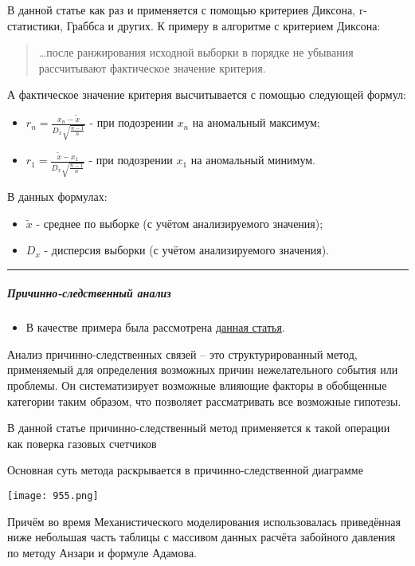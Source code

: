 \documentclass[
]{article}
\providecommand{\tightlist}{%
  \setlength{\itemsep}{0pt}\setlength{\parskip}{0pt}}
\begin{document}
В данной статье как раз и применяется с помощью критериев Диксона,
r-статистики, Граббса и других. К примеру в алгоритме с критерием
Диксона:

\begin{quote}
\ldots после ранжирования исходной выборки в порядке не убывания
рассчитывают фактическое значение критерия.
\end{quote}

А фактическое значение критерия высчитывается с помощью следующей
формул:

\begin{itemize}
\tightlist
\item
  \(r_{n} = \frac{x_{n} - \tilde{x}}{D_{x}\sqrt{\frac{n-1}{n}}}\) - при
  подозрении \(x_{n}\) на аномальный максимум;
\item
  \(r_{1} = \frac{\tilde{x} - x_{1}}{D_{x}\sqrt{\frac{n-1}{n}}}\) - при
  подозрении \(x_{1}\) на аномальный минимум.
\end{itemize}

В данных формулах:

\begin{itemize}
\tightlist
\item
  \(\tilde{x}\) - среднее по выборке (с учётом анализируемого значения);
\item
  \(D_{x}\) - дисперсия выборки (с учётом анализируемого значения).
\end{itemize}

\begin{center}\rule{0.5\linewidth}{0.5pt}\end{center}

\hypertarget{ux43fux440ux438ux447ux438ux43dux43dux43e-ux441ux43bux435ux434ux441ux442ux432ux435ux43dux43dux44bux439-ux430ux43dux430ux43bux438ux437}{%
\subparagraph{\texorpdfstring{\textbf{Причинно-следственный
анализ}}{Причинно-следственный анализ}}\label{ux43fux440ux438ux447ux438ux43dux43dux43e-ux441ux43bux435ux434ux441ux442ux432ux435ux43dux43dux44bux439-ux430ux43dux430ux43bux438ux437}}

\begin{itemize}
\tightlist
\item
  В качестве примера была рассмотрена
  \href{https://elibrary.ru/download/elibrary_35222055_16840035.pdf}{данная
  статья}.
\end{itemize}

Анализ причинно-следственных связей -- это структурированный метод,
применяемый для определения возможных причин нежелательного события или
проблемы. Он систематизирует возможные влияющие факторы в обобщенные
категории таким образом, что позволяет рассматривать все возможные
гипотезы.

В данной статье причинно-следственный метод применяется к такой операции
как поверка газовых счетчиков

Основная суть метода раскрывается в причинно-следственной диаграмме

\texttt{[image: 955.png]}

Причём во время Механистического моделирования использовалась
приведённая ниже небольшая часть таблицы с массивом данных расчёта
забойного давления по методу Анзари и формуле Адамова.
\end{document}
